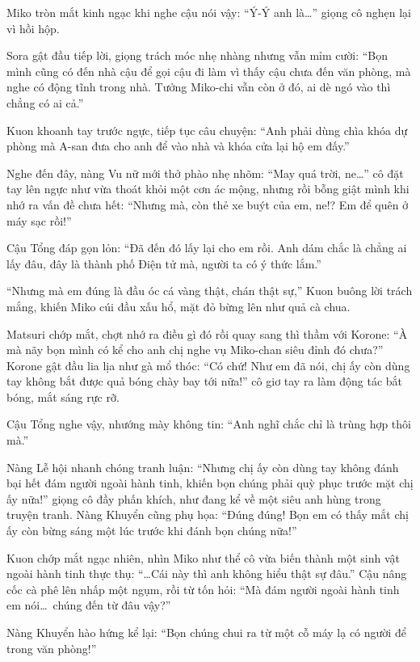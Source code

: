 \documentclass[../main.tex]{subfiles}
\begin{document}
Miko tròn mắt kinh ngạc khi nghe cậu nói vậy: ``Ý-Ý anh là\dots'' giọng cô nghẹn lại vì hồi hộp.

Sora gật đầu tiếp lời, giọng trách móc nhẹ nhàng nhưng vẫn mỉm cười: ``Bọn mình cũng có đến nhà cậu để gọi cậu đi làm vì thấy cậu chưa đến văn phòng, mà nghe có động tĩnh trong nhà. Tưởng Miko-chi vẫn còn ở đó, ai dè ngó vào thì chẳng có ai cả.''

Kuon khoanh tay trước ngực, tiếp tục câu chuyện: ``Anh phải dùng chìa khóa dự phòng mà A-san đưa cho anh để vào nhà và khóa cửa lại hộ em đấy.''

Nghe đến đây, nàng Vu nữ mới thở phào nhẹ nhõm: ``May quá trời, ne\dots'' cô đặt tay lên ngực như vừa thoát khỏi một cơn ác mộng, nhưng rồi bỗng giật mình khi nhớ ra vấn đề chưa hết: ``Nhưng mà, còn thẻ xe buýt của em, ne!? Em để quên ở máy sạc rồi!''

Cậu Tổng đáp gọn lỏn: ``Đã đến đó lấy lại cho em rồi. Anh dám chắc là chẳng ai lấy đâu, đây là thành phố Điện tử mà, người ta có ý thức lắm.''

``Nhưng mà em đúng là đầu óc cá vàng thật, chán thật sự,'' Kuon buông lời trách mắng, khiến Miko cúi đầu xấu hổ, mặt đỏ bừng lên như quả cà chua.

Matsuri chớp mắt, chợt nhớ ra điều gì đó rồi quay sang thì thầm với Korone: ``À mà nãy bọn mình có kể cho anh chị nghe vụ Miko-chan siêu đỉnh đó chưa?'' Korone gật đầu lia lịa như gà mổ thóc: ``Có chứ! Như em đã nói, chị ấy còn dùng tay không bắt được quả bóng chày bay tới nữa!'' cô giơ tay ra làm động tác bắt bóng, mắt sáng rực rỡ.

Cậu Tổng nghe vậy, nhướng mày không tin: ``Anh nghĩ chắc chỉ là trùng hợp thôi mà.''

Nàng Lễ hội nhanh chóng tranh luận: ``Nhưng chị ấy còn dùng tay không đánh bại hết đám người ngoài hành tinh, khiến bọn chúng phải quỳ phục trước mặt chị ấy nữa!'' giọng cô đầy phấn khích, như đang kể về một siêu anh hùng trong truyện tranh. Nàng Khuyển cũng phụ họa: ``Đúng đúng! Bọn em có thấy mắt chị ấy còn bừng sáng một lúc trước khi đánh bọn chúng nữa!''

Kuon chớp mắt ngạc nhiên, nhìn Miko như thể cô vừa biến thành một sinh vật ngoài hành tinh thực thụ: ``\dots Cái này thì anh không hiểu thật sự đâu.'' Cậu nâng cốc cà phê lên nhấp một ngụm, rồi từ tốn hỏi: ``Mà đám người ngoài hành tinh em nói\dots\ chúng đến từ đâu vậy?''

Nàng Khuyển hào hứng kể lại: ``Bọn chúng chui ra từ một cỗ máy lạ có người để trong văn phòng!''
\end{document}
